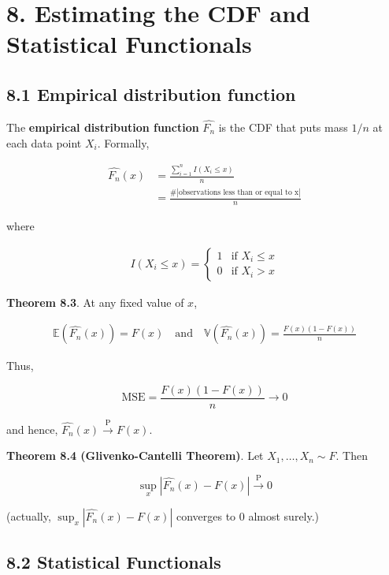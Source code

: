 \section*{8. Estimating the CDF and Statistical Functionals}\label{estimating-the-cdf-and-statistical-functionals}

\subsection*{8.1 Empirical distribution
function}\label{empirical-distribution-function}

The \textbf{empirical distribution function} \(\hat{F_{n}}\) is the CDF
that puts mass \(1/n\) at each data point \(X_{i}\). Formally,

\begin{align*}
\hat{F_{n}}(x) & = \frac{\sum_{i=1}^{n} I\left(X_{i} \leq x \right)}{n} \\
& = \frac{\#|\text{observations less than or equal to x}|}{n}
\end{align*}

where

\begin{align*}I\left(X_{i} \leq x\right) =
    \begin{cases}
      1   & \text{if } X_{i} \leq x \\
      0   & \text{if } X_{i} > x
    \end{cases}       
\end{align*}

\textbf{Theorem 8.3}. At any fixed value of \(x\),

\begin{align*}\mathbb{E}\left( \hat{F_{n}}(x) \right) = F(x)
\quad\mathrm{and}\quad 
\mathbb{V}\left( \hat{F_{n}}(x) \right) = \frac{F(x)(1 - F(x))}{n}
\end{align*}

Thus,

\[ \text{MSE} = \frac{F(x)(1 - F(x))}{n} \rightarrow 0 \]

and hence, \(\hat{F_{n}}(x) \xrightarrow{\text{P}} F(x)\).

\textbf{Theorem 8.4 (Glivenko-Cantelli Theorem)}. Let
\(X_{1}, \dots, X_{n} \sim F\). Then

\[ \sup _x |\hat{F_{n}}(x) - F(x)| \xrightarrow{\text{P}} 0 \]

(actually, \(\sup _x |\hat{F_{n}}(x) - F(x)|\) converges to 0 almost
surely.)

\subsection*{8.2 Statistical
Functionals}\label{statistical-functionals}

